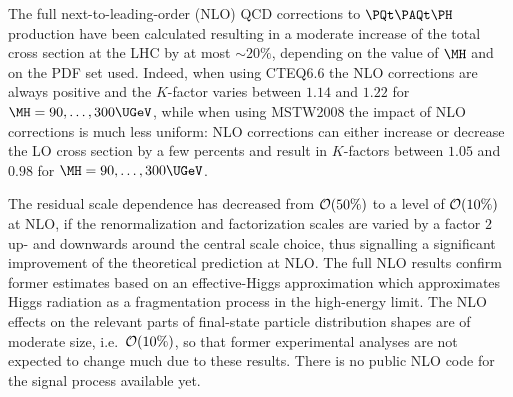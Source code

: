 The full next-to-leading-order (NLO) QCD corrections to $\PQt\PAQt\PH$
production have been calculated
\cite{Beenakker:2001rj,Beenakker:2002nc,Reina:2001sf,Dawson:2002tg}
resulting in a moderate increase of the total cross section at the LHC
by at most $\sim 20\%$, depending on the value of $\MH$ and on the PDF
set used. Indeed, when using CTEQ6.6 the NLO corrections are always
positive and the $K$-factor varies between $1.14$ and $1.22$ for
$\MH=90,\ldots,300\UGeV$, while when using MSTW2008 the impact of NLO
corrections is much less uniform: NLO corrections can either increase
or decrease the LO cross section by a few percents and result in 
$K$-factors between $1.05$ and $0.98$ for $\MH=90,\ldots,300\UGeV$.  

The residual scale dependence has decreased from ${\cal O}(50\%)$ to a
level of ${\cal O}(10\%)$ at NLO, if the renormalization and
factorization scales are varied by a factor $2$ up- and downwards around
the central scale choice, thus signalling a significant improvement of
the theoretical prediction at NLO. The full NLO results confirm former
estimates based on an effective-Higgs approximation \cite{Dawson:1997im}
which approximates Higgs radiation as a fragmentation process in the
high-energy limit. The NLO effects on the relevant parts of final-state
particle distribution shapes are of moderate size, i.e.~${\cal
O}(10\%)$, so that former experimental analyses are not expected to
change much due to these results. There is no public NLO code for the
signal process available yet.

